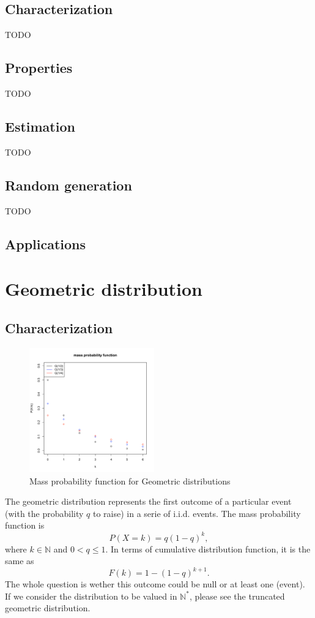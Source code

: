  
    
\subsection{Characterization}
TODO
\subsection{Properties}
TODO
\subsection{Estimation}
TODO
\subsection{Random generation}
TODO
\subsection{Applications}

\section{Geometric distribution}
\subsection{Characterization}
\begin{figure}
  \vspace{-20pt}
  \begin{center}
    \includegraphics[width=0.48\textwidth]{img/geomzoom}
  \end{center}
  \vspace{-20pt}
  \caption{Mass probability function for Geometric distributions}

\end{figure}
The geometric distribution represents the first outcome of a particular event (with the probability $q$ to raise) in a serie of i.i.d. events. The mass probability function is 
$$
P(X=k) = q(1-q)^{k},
$$
where $k\in\mathbb N$ and $0<q\leq 1$. In terms of cumulative distribution function, it is the same as
$$
F(k) = 1- (1-q)^{k+1}.
$$
The whole question is wether this outcome could be null or at least one (event). 
If we consider the distribution to be valued in $\mathbb N^*$, please see the truncated geometric distribution.

